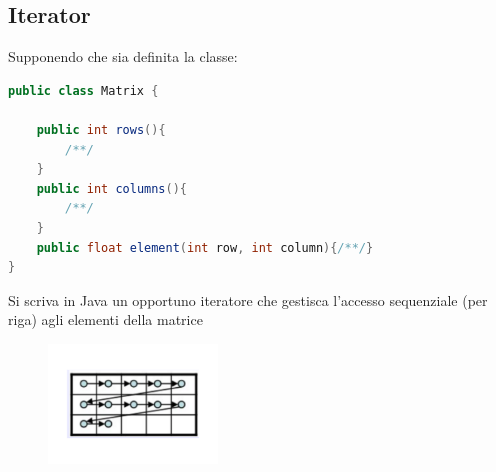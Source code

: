 \documentclass{article}
\begin{document}
\subsection{Iterator}
\begin{framed}
Supponendo che sia definita la classe:
\begin{lstlisting}[language=Java]
public class Matrix {
	
	public int rows(){
	    /**/
	}
	public int columns(){
    	/**/
	}
	public float element(int row, int column){/**/}
}
\end{lstlisting}
Si scriva in Java un opportuno iteratore che gestisca l’accesso sequenziale (per riga) agli elementi della matrice
\end{framed}
\begin{figure}[h]
\includegraphics[width=0.4\textwidth]{Img/Matrix.pdf}
\end{figure}
\end{document}
